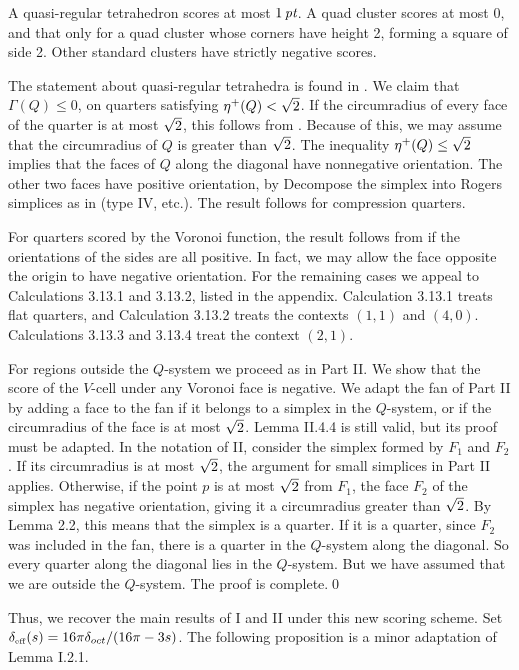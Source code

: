  A quasi-regular tetrahedron scores at most $1\,\hbox{\it pt}$.
A quad cluster scores at most $0$, and that only for a quad cluster
whose corners have height 2, forming a square of side 2.
Other standard clusters have strictly negative scores.
\endproclaim

  The statement about quasi-regular tetrahedra is
found in \cite{I}.
We claim that $\Gamma(Q)\le 0$, on quarters satisfying $\eta^+(Q)<\sqrt2$.
If the circumradius of every face of the quarter is at most $\sqrt2$,
 this follows from \cite{II.4.5.1}.  
Because of this, we may assume that
the circumradius of $Q$ is greater than $\sqrt2$. 
The inequality $\eta^+(Q)\le\sqrt2$ implies
that the faces of $Q$ along the diagonal have nonnegative orientation.
The other two faces have positive orientation, by \cite{I.3.4.}
 Decompose the simplex into Rogers simplices as in \cite{II}
(type IV, etc.).  The result follows for compression quarters.

For quarters scored by the Voronoi function, 
the result follows from \cite{II} if
the orientations of the sides are all positive.  In fact, we may allow
the face opposite the origin to have negative
orientation.  For the remaining cases we appeal to Calculations 
3.13.1
and 3.13.2, listed in the appendix.  Calculation 3.13.1
treats flat quarters, and Calculation 3.13.2 treats the contexts
$(1,1)$ and $(4,0)$.  Calculations 3.13.3 and 3.13.4 treat
the
context $(2,1)$.

For regions outside the $Q$-system we proceed as in Part II.
We show that the score of the $V$-cell under any Voronoi face
is negative.  We adapt the fan of Part II by adding a face to the
fan if it belongs to a simplex  in the $Q$-system,
or if the circumradius of the
face is at most $\sqrt2$. 
Lemma II.4.4 is still valid, but its proof must
be adapted.  In the notation of II, 
consider the simplex formed by $F_1$ and $F_2$.
If its circumradius is at most $\sqrt2$, the argument for
small simplices in Part II
applies.  Otherwise, if the point $p$ is at most $\sqrt2$ from
$F_1$, the face $F_2$ of the simplex has negative orientation,
giving it a circumradius greater than $\sqrt2$. By
Lemma 2.2, this means that the simplex is a quarter. 
If it is a quarter, since $F_2$ was included in the fan, there
is a quarter in the $Q$-system along the diagonal.  So
every quarter along the diagonal lies in the $Q$-system.  But we have
assumed that we are outside the $Q$-system. 
The proof is complete.\qed\enddemo

Thus, we recover the main results of I and II under this new scoring scheme.  
Set $\operatorname{\delta_{\operatorname{\scriptscriptstyle eff}}}(s) = 16\pi\delta_{oct}/(16\pi-3s)$.  The following proposition
is a minor adaptation of Lemma I.2.1.

